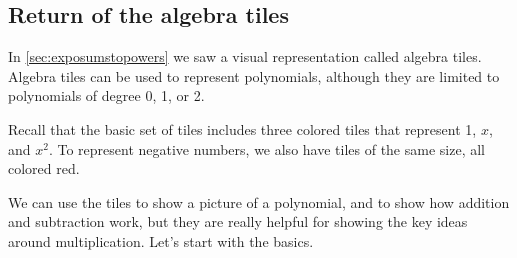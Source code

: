 \subsection{Return of the algebra tiles}

In \cref{sec:exposumstopowers} we saw a visual representation called algebra tiles. Algebra tiles can be used to represent polynomials, although they are limited to polynomials of degree 0, 1, or 2.

Recall that the basic set of tiles includes three colored tiles that represent 1, $x$, and $x^2$. To represent negative numbers, we also have tiles of the same size, all colored red.

\begin{figure}
\end{figure}

We can use the tiles to show a picture of a polynomial, and to show how addition and subtraction work, but they are really helpful for showing the key ideas around multiplication. Let's start with the basics.

